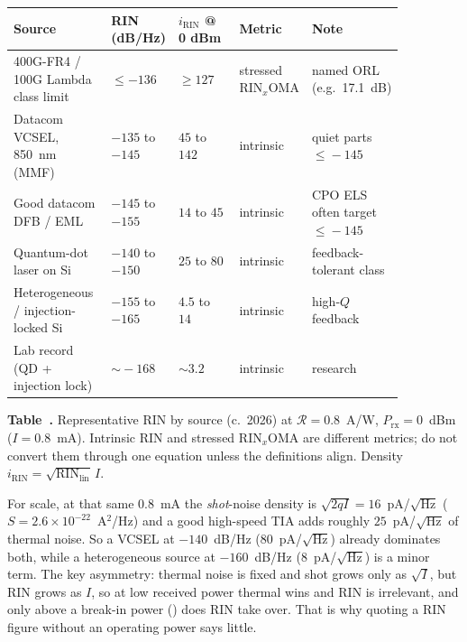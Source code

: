 \begin{table}[ht]
\label{tab:rin-values}%
\centering
\setlength{\tabcolsep}{4pt}%
\renewcommand{\arraystretch}{1.25}%
\begin{tabular}{@{}p{0.26\linewidth}p{0.12\linewidth}p{0.18\linewidth}p{0.12\linewidth}p{0.18\linewidth}@{}}
\toprule
Source & RIN (dB/Hz) & $i_{\text{RIN}}$ @ 0 dBm & Metric & Note \\
\midrule
400G-FR4 / 100G Lambda class limit & $\le -136$ & $\ge 127$ & stressed $\mathrm{RIN}_x\mathrm{OMA}$ & named ORL (e.g.\ 17.1~dB) \\
\addlinespace[1.5em]
Datacom VCSEL, 850~nm (MMF) & $-135$ to $-145$ & $45$ to $142$ & intrinsic & quiet parts $\le\!-145$ \\
\addlinespace[1.5em]
Good datacom DFB / EML & $-145$ to $-155$ & $14$ to $45$ & intrinsic & CPO ELS often target $\le\!-145$ \\
\addlinespace[1.5em]
Quantum-dot laser on Si & $-140$ to $-150$ & $25$ to $80$ & intrinsic & feedback-tolerant class \\
\addlinespace[1.5em]
Heterogeneous / injection-locked Si & $-155$ to $-165$ & $4.5$ to $14$ & intrinsic & high-$Q$ feedback \\
\addlinespace[1.5em]
Lab record (QD + injection lock) & $\sim\!-168$ & $\sim 3.2$ & intrinsic & research \\
\bottomrule
\end{tabular}
\par\medskip
{\raggedright\footnotesize\textbf{Table~\thetable.} Representative RIN by source
(c.~2026) at $\mathcal{R}=0.8$~A/W, $P_{\text{rx}}=0$~dBm ($I=0.8$~mA). Intrinsic
RIN and stressed $\mathrm{RIN}_x\mathrm{OMA}$ are different metrics; do not convert
them through one equation unless the definitions align. Density
$i_{\text{RIN}}=\sqrt{\mathrm{RIN}_{\text{lin}}}\,I$.\par}
\end{table}

For scale, at that same $0.8$~mA the \emph{shot}-noise density is
$\sqrt{2qI}=16$~pA/$\sqrt{\text{Hz}}$ ($S=2.6\times10^{-22}$~A$^2$/Hz) and a good
high-speed TIA adds roughly $25$~pA/$\sqrt{\text{Hz}}$ of thermal noise. So a VCSEL
at $-140$~dB/Hz ($80$~pA/$\sqrt{\text{Hz}}$) already dominates both, while a
heterogeneous source at $-160$~dB/Hz ($8$~pA/$\sqrt{\text{Hz}}$) is a minor term.
The key asymmetry: thermal noise is fixed and shot grows only as $\sqrt{I}$, but
RIN grows as $I$, so at low received power thermal wins and RIN is irrelevant, and
only above a break-in power () does RIN take over. That is
why quoting a RIN figure without an operating power says little.


